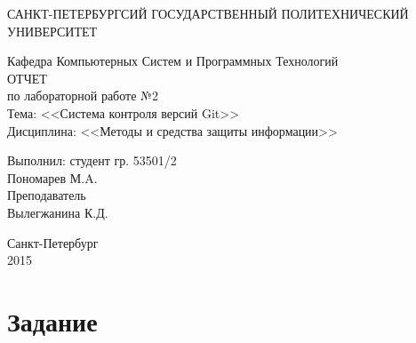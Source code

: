 \documentclass[utf8x, 12pt]{G7-32}
\begin{document}
\frontmatter 


\begin{center} 

\large САНКТ-ПЕТЕРБУРГСИЙ ГОСУДАРСТВЕННЫЙ ПОЛИТЕХНИЧЕСКИЙ УНИВЕРСИТЕТ

\large Кафедра Компьютерных Систем и Программных Технологий \\[5.5cm] 

\huge ОТЧЕТ \\[0.6cm] %
\large по лабораторной работе №2\\
\large Тема: <<Система контроля версий Git>>\\
\large Дисциплина: <<Методы и средства защиты информации>>\\[3.7cm]

\end{center} 

\begin{flushright}
Выполнил: студент гр. 53501/2 \\
Пономарев М.A. \\[1.2cm]


Преподаватель \\
Вылегжанина К.Д.
\end{flushright}


\vfill 

\begin{center} 
\large Санкт-Петербург \\
2015
\end{center} 

\thispagestyle{empty}



\thispagestyle{empty}
\setcounter{page}{0}
\tableofcontents
\clearpage
\mainmatter


\chapter{Задание}
\end{document}
